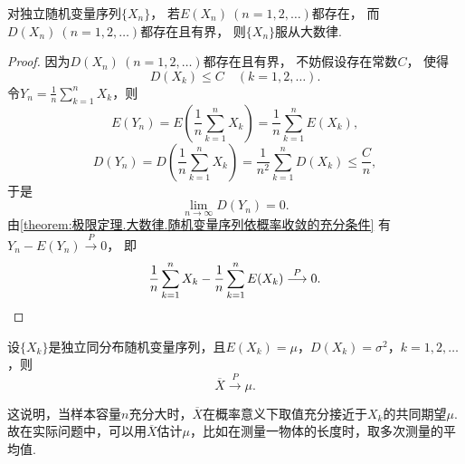\begin{theorem}[切比雪夫大数律]\label{theorem:极限定理.大数律.切比雪夫大数律}
对独立随机变量序列\(\{X_n\}\)，
若\(E(X_n)\ (n=1,2,\dotsc)\)都存在，
而\(D(X_n)\ (n=1,2,\dotsc)\)都存在且有界，
则\(\{X_n\}\)服从大数律.
\begin{proof}
因为\(D(X_n)\ (n=1,2,\dotsc)\)都存在且有界，
不妨假设存在常数\(C\)，
使得\[
	D(X_k) \leq C
	\quad(k=1,2,\dotsc).
\]
\def\Yn{\frac{1}{n} \sum_{k=1}^n X_k}
令\(Y_n=\Yn\)，则\[
	E(Y_n)
	= E\left(\Yn\right)
	= \frac{1}{n} \sum_{k=1}^n E(X_k),
\]\[
	D(Y_n)
	= D\left(\Yn\right)
	= \frac{1}{n^2} \sum_{k=1}^n D(X_k) \leq \frac{C}{n},
\]
于是\[
	\lim_{n\to\infty} D(Y_n)
	= 0.
\]
由\cref{theorem:极限定理.大数律.随机变量序列依概率收敛的充分条件}
有\(Y_n - E(Y_n) \overset{P}{\longrightarrow} 0\)，
即\[
	\frac{1}{n} \sum_{k=1}^n X_k
	- \frac{1}{n} \sum_{k=1}^n E(X_k)
	\overset{P}{\longrightarrow} 0.
	\qedhere
\]
\end{proof}
\end{theorem}

\begin{corollary}[独立同分布大数律]\label{theorem:极限定理.大数律.独立同分布大数律}
设\(\{X_k\}\)是独立同分布随机变量序列，且\(E(X_k)=\mu\)，\(D(X_k)=\sigma^2\)，\(k=1,2,\dotsc\)，则\[
\overline{X} \overset{P}{\longrightarrow} \mu.
\]
\end{corollary}
这说明，当样本容量\(n\)充分大时，\(\overline{X}\)在概率意义下取值充分接近于\(X_k\)的共同期望\(\mu\).
故在实际问题中，可以用\(\overline{X}\)估计\(\mu\)，比如在测量一物体的长度时，取多次测量的平均值.

